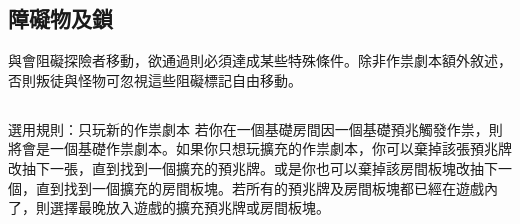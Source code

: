 
\subsection{障礙物及鎖}

與會阻礙探險者移動，欲通過則必須達成某些特殊條件。除非作祟劇本額外敘述，否則叛徒與怪物可忽視這些阻礙標記自由移動。


\subsection*{}

\begin{RuleBox}{選用規則：只玩新的作祟劇本}
	若你在一個基礎房間因一個基礎預兆觸發作祟，則將會是一個基礎作祟劇本。如果你只想玩擴充的作祟劇本，你可以棄掉該張預兆牌改抽下一張，直到找到一個擴充的預兆牌。或是你也可以棄掉該房間板塊改抽下一個，直到找到一個擴充的房間板塊。若所有的預兆牌及房間板塊都已經在遊戲內了，則選擇最晚放入遊戲的擴充預兆牌或房間板塊。
\end{RuleBox}
